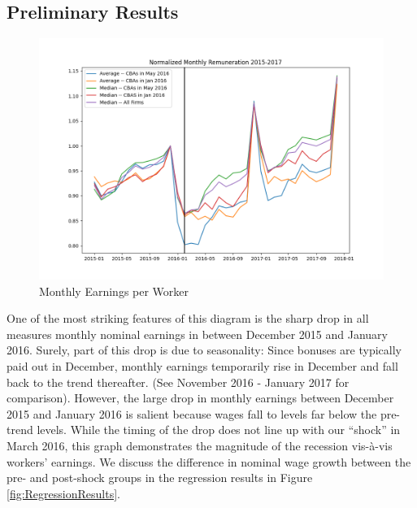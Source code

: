 \documentclass[12pt]{article}
\begin{document}
		\subsection{Preliminary Results}
		\begin{figure}[!ht]
			\centering
			\caption{Monthly Earnings per Worker}
			\label{fig:NormWages}
			\includegraphics[scale = .65]{tables-figures/normalized_avg_med_rem_2015_2017.png}
		\end{figure}
		One of the most striking features of this diagram is the sharp drop in all measures monthly nominal earnings in between December 2015 and January 2016. Surely, part of this drop is due to seasonality: Since bonuses are typically paid out in December, monthly earnings temporarily rise in December and fall back to the trend thereafter. (See November 2016 - January 2017 for comparison). However, the large drop in monthly earnings between December 2015 and January 2016 is salient because wages fall to levels far below the pre-trend levels. While the timing of the drop does not line up with our ``shock'' in March 2016, this graph demonstrates the magnitude of the recession vis-à-vis workers' earnings.  We discuss the difference in nominal wage growth between the pre- and post-shock groups in the regression results in Figure \ref{fig:RegressionResults}.
\end{document}
